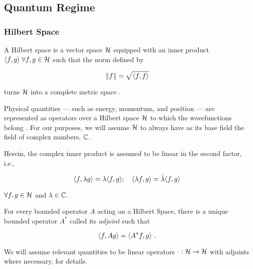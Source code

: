 \subsection{Quantum Regime}

\subsubsection{Hilbert Space}
\begin{definition}
    A Hilbert space is a vector space \(\mathcal{H}\) equipped with an inner
    product \(\langle f, g\rangle \;\forall f, g \in \mathcal{H}\) such that
    the norm defined by

    \begin{equation*}
        \norm{f} = \sqrt{\langle f, f\rangle}
    \end{equation*}

    turns \(\mathcal{H}\) into a complete metric space
    \cite{sansone1959orthogonal}.
\end{definition}

Physical quantities --- such as energy, momentum, and position --- are
represented as operators over a Hilbert space \(\mathcal{H}\) to which the
wavefunctions belong \cite{hall2013quantum}. 
For our purposes, we will assume \(\mathcal{H}\) to always
have as its base field the field of complex numbers, \(\mathbb{C}\).

Herein, the complex inner product is assumed to be linear in the second factor,
i.e.,

\begin{equation*}
    \langle f, \lambda g\rangle = \lambda \langle f, g\rangle; \quad \langle \lambda f, g\rangle = \bar{\lambda} \langle f, g\rangle
\end{equation*}

\(\forall f, g \in \mathcal{H}\) and \(\lambda \in \mathbb{C}\). 

For every bounded operator \(A\) acting on a Hilbert Space, there is a unique
bounded operator \(A^*\) called its \emph{adjoint} such that

\begin{equation*}
    \langle f, Ag\rangle = \langle A^*f, g\rangle~.
\end{equation*}

We will assume relevant quantities to be linear operators \(\cdot :
\mathcal{H} \to \mathcal{H}\) with adjoints where necessary,
\cite[see][Appendix A]{hall2013quantum} for details.

